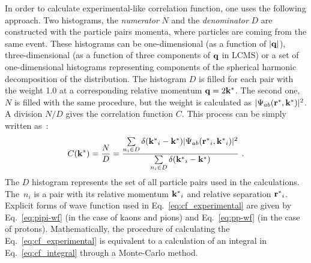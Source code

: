     In order to calculate experimental-like correlation function, one uses the following approach.
    Two histograms, the \textit{numerator} $N$ and the \textit{denominator} $D$ are constructed with the particle pairs momenta, where particles are coming from the same event.
    These histograms can be one-dimensional (as a function of $|\mathbf{q}|$), three-dimensional (as a function of three components of $\mathbf{q}$ in LCMS) or a set of one-dimensional histograms representing components of the spherical harmonic decomposition of the distribution.
    The histogram $D$ is filled for each pair with the weight 1.0 at a corresponding relative momentum $\mathbf{q} = 2 \mathbf{k^*}$.
    The second one, $N$ is filled with the same procedure, but the weight is calculated as $|\Psi_{ab}(\mathbf{r^*},\mathbf{k^*})|^2$.
    A division $N/D$ gives the correlation function $C$.
    This process can be simply written as~\cite{nonidfemto}:
    \begin{equation}
      \label{eq:cf_experimental}
      C(\mathbf{k^*}) = \frac{N}{D} =  \frac{\sum\limits_{n_i \in D} \delta(\mathbf{k^*}_i - \mathbf{k^*}) |\Psi_{ab}(\mathbf{r^*}_i,\mathbf{k^*}_i)|^2 }{\sum\limits_{n_i \in D} \delta(\mathbf{k^*}_i - \mathbf{k^*})}~.
    \end{equation}
    The $D$ histogram represents the set of all particle pairs used in the calculations.
    The~$n_i$ is a pair with its relative momentum $\mathbf{k^*}_i$ and relative separation $\mathbf{r^*}_i$.
    Explicit forms of wave function used in Eq.~\ref{eq:cf_experimental} are given by Eq.~\ref{eq:pipi-wf} (in the case of kaons and pions) and Eq.~\ref{eq:pp-wf} (in the case of protons).
    Mathematically, the procedure of calculating the Eq.~\ref{eq:cf_experimental} is equivalent to a calculation of an integral in Eq.~\ref{eq:cf_integral} through a Monte-Carlo method.

